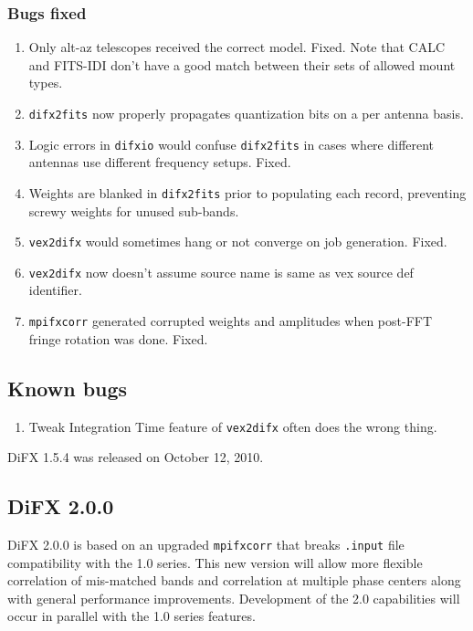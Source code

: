 \subsubsection{Bugs fixed}

\begin{enumerate}
\item Only alt-az telescopes received the correct model.  Fixed.  Note that CALC and FITS-IDI don't have a good match between their sets of allowed mount types.
\item {\tt difx2fits} now properly propagates quantization bits on a per antenna basis.
\item Logic errors in {\tt difxio} would confuse {\tt difx2fits} in cases where different antennas use different frequency setups.  Fixed.
\item Weights are blanked in {\tt difx2fits} prior to populating each record, preventing screwy weights for unused sub-bands.
\item {\tt vex2difx} would sometimes hang or not converge on job generation.  Fixed.
\item {\tt vex2difx} now doesn't assume source name is same as vex source def identifier.
\item {\tt mpifxcorr} generated corrupted weights and amplitudes when post-FFT fringe rotation was done.  Fixed.
\end{enumerate}

\subsection{Known bugs}

\begin{enumerate}
\item Tweak Integration Time feature of {\tt vex2difx} often does the wrong thing.
\end{enumerate}

DiFX 1.5.4 was released on October 12, 2010.

\subsection{DiFX 2.0.0}

DiFX 2.0.0 is based on an upgraded {\tt mpifxcorr} that breaks {\tt .input} file compatibility with the 1.0 series.
This new version will allow more flexible correlation of mis-matched bands and correlation at multiple phase centers along with general performance improvements.
Development of the 2.0 capabilities will occur in parallel with the 1.0 series features.

